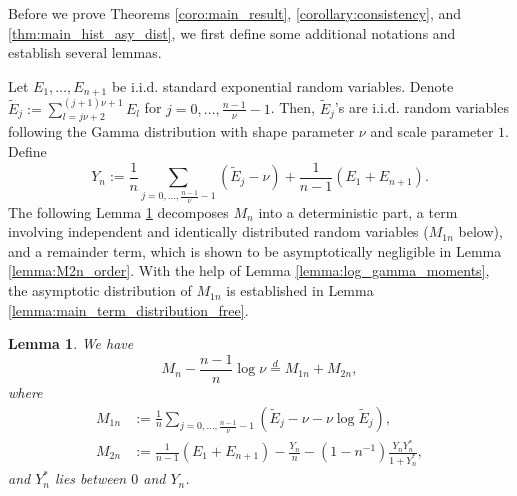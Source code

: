 \documentclass[12pt,letterpaper, twoside, openany]{article}
\theoremstyle{plain}
\newtheorem{lemma}[theorem]{Lemma}
\begin{document}
Before we prove Theorems \ref{coro:main_result}, \ref{corollary:consistency}, and \ref{thm:main_hist_asy_dist}, we first define some additional notations and establish several lemmas. 

Let $E_1,\ldots, E_{n+1}$ be i.i.d. standard exponential random variables. 
Denote $\tilde{E}_j := \sum^{(j+1)\nu+1}_{l=j\nu+2} E_l$ for $j=0,\ldots,\frac{n-1}{\nu}-1$. Then, $\tilde{E}_j$'s are i.i.d. random variables following the Gamma distribution with shape parameter $\nu$ and scale parameter $1$.
Define
\begin{equation*}
	Y_n := \frac{1}{n} \sum_{j=0,\ldots,\frac{n-1}{\nu}-1} (\tilde{E}_j - \nu) + \frac{1}{n-1} (E_1 + E_{n+1}).
\end{equation*}
The following Lemma \ref{lemma:dist_same} decomposes $M_n$ into a deterministic part, a term involving independent and identically distributed random variables ($M_{1n}$ below), and a remainder term, which is shown to be asymptotically negligible in Lemma \ref{lemma:M2n_order}. With the help of Lemma \ref{lemma:log_gamma_moments}, the asymptotic distribution of $M_{1n}$ is established in Lemma \ref{lemma:main_term_distribution_free}.
\begin{lemma}\label{lemma:dist_same}
	We have
	\begin{equation*}
		M_n - \frac{n-1}{n}\log \nu \stackrel{d}{=} M_{1n} + M_{2n},
	\end{equation*}
	where
	\begin{align*}
		M_{1n} &:= \frac{1}{n} \sum_{j=0,\ldots, \frac{n-1}{\nu}-1} \left( \tilde{E}_j - \nu - \nu \log \tilde{E}_j \right),\\
		M_{2n} &:= \frac{1}{n-1} (E_1+E_{n+1})- \frac{Y_n}{n} - (1-n^{-1})\frac{Y_n Y^*_n}{1+Y^*_n},
	\end{align*}
	and $Y^*_n$ lies between $0$ and $Y_n$.
\end{lemma}
%
\end{document}
